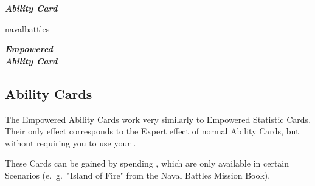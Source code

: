 \begin{paracol}{2}
  \begin{expansion}[title=\phantom{\textbf{\tiny{foo}}}, overlay={}]{}
    \footnotesize
    \begin{center}
      \begin{scriptsize}
      \end{scriptsize}
      \textbf{\textit{\textcolor{darkcandyapplered}{Ability Card\\\phantom{Blah}}}}
    \end{center}
  \end{expansion}
  \switchcolumn
  \begin{expansion}{navalbattles}
    \begin{minipage}[t]{0.3\linewidth}
      \footnotesize
      \vspace*{0mm}
      \begin{center}
        \begin{scriptsize}
        \end{scriptsize}
        \textbf{\textit{\textcolor{darkcandyapplered}{Empowered\\Ability Card}}}
      \end{center}
    \end{minipage}
    \hfill
    \begin{minipage}[t]{0.65\linewidth}
      \subsection*{ Ability Cards}
      The Empowered Ability Cards work very similarly to Empowered Statistic Cards.
      Their only effect corresponds to the Expert effect of normal Ability Cards, but without requiring you to use your .

      \medskip
      These Cards can be gained by spending , which are only available in certain Scenarios (e.~g.~"Island of Fire" from the Naval Battles Mission Book).
    \end{minipage}
  \end{expansion}
\end{paracol}

